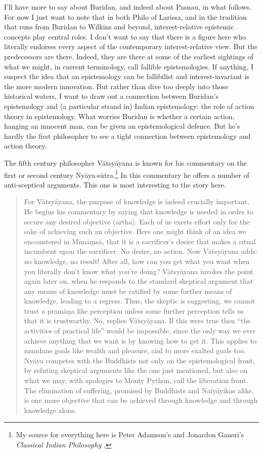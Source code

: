 \documentclass[
  11pt,
]{book}
\begin{document}
I'll have more to say about Buridan, and indeed about Pasnau, in what follows. For now I just want to note that in both Philo of Larissa, and in the tradition that runs from Buridan to Wilkins and beyond, interest-relative epistemic concepts play central roles. I don't want to say that there is a figure here who literally endorses every aspect of the contemporary interest-relative view. But the predecessors are there. Indeed, they are there at some of the earliest sightings of what we might, in current terminology, call fallible epistemologies. If anything, I suspect the idea that an epistemology can be fallibilist and interest-invariant is the more modern innovation. But rather than dive too deeply into those historical waters, I want to draw out a connection between Buridan's epistemology and (a particular strand in) Indian epistemology: the role of action theory in epistemology. What worries Buridan is whether a certain action, hanging an innocent man, can be given an epistemological defence. But he's hardly the first philosopher to see a tight connection between epistemology and action theory.

The fifth century philosopher Vātsyāyana is known for his commentary on the first or second century Nyāya-sūtra.\footnote{My source for everything here is Peter Adamson's and Jonardon Ganeri's \emph{Classical Indian Philosophy} \citep{AdamsonGaneri2020}.} In this commentary he offers a number of anti-sceptical arguments. This one is most interesting to the story here.

\begin{quote}
For Vātsyāyana, the purpose of knowledge is indeed crucially important. He begins his commentary by saying that knowledge is needed in order to secure any desired objective (artha). Each of us exerts effort only for the sake of achieving such an objective. Here one might think of an idea we encountered in Mīmāṃsā, that it is a sacrificer's desire that makes a ritual incumbent upon the sacrificer. No desire, no action. Now Vātsyāyana adds: no knowledge, no result! After all, how can you get what you want when you literally don't know what you're doing? Vātsyāyana invokes the point again later on, when he responds to the standard skeptical argument that any means of knowledge must be ratified by some further means of knowledge, leading to a regress. Thus, the skeptic is suggesting, we cannot trust a pramāṇa like perception unless some further perception tells us that it is trustworthy. No, replies Vātsyāyana. If this were true then ``the activities of practical life'' would be impossible, since the only way we ever achieve anything that we want is by knowing how to get it. This applies to mundane goals like wealth and pleasure, and to more exalted goals too. Nyāya competes with the Buddhists not only on the epistemological front, by refuting skeptical arguments like the one just mentioned, but also on what we may, with apologies to Monty Python, call the liberation front. The elimination of suffering, promised by Buddhists and Naiyāyikas alike, is one more objective that can be achieved through knowledge and through knowledge alone. \citep[170]{AdamsonGaneri2020}
\end{quote}
\end{document}
